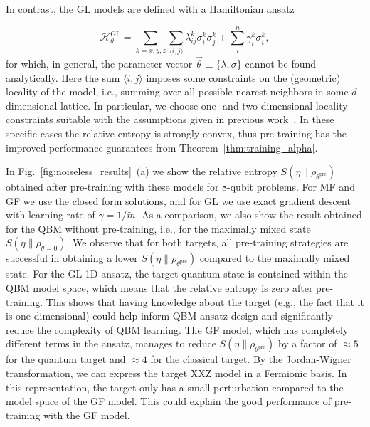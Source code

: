 \documentclass[
    reprint,
    aps,
    prx,
    longbibliography
]{revtex4-2}
\begin{document}
In contrast, the GL models are defined with a Hamiltonian ansatz

\begin{equation} 
\label{eq:glHam}
    \mathcal{H}_\theta^{\mathrm{GL}} = \sum_{k=x,y,z}\sum_{\langle i, j\rangle}\lambda^k_{ij}\sigma_i^k\sigma^k_j + \sum_i^n \gamma^k_i\sigma^k_i,
\end{equation} 
for which, in general, the parameter vector $\vec{\theta}\equiv\{\lambda, \sigma\}$ cannot be found analytically. Here the sum $\langle i, j\rangle$ imposes some constraints on the (geometric) locality of the model, i.e., summing over all possible nearest neighbors in some $d$-dimensional lattice. In particular, we choose one- and two-dimensional locality constraints suitable with the assumptions given in previous work~\cite{Anshu_2021, Haah_2024}. In these specific cases the relative entropy is strongly convex, thus pre-training has the improved performance guarantees from Theorem~\ref{thm:training_alpha}.

In Fig.~\ref{fig:noiseless_results}~(a) we show the  relative entropy $S(\eta\|\rho_{\theta^{\mathrm{pre}}})$ obtained after pre-training with these models for $8$-qubit problems. For MF and GF we use the closed form solutions, and for GL we use exact gradient descent with learning rate of $\gamma=1/\tilde{m}$. As a comparison, we also show the result obtained for the QBM without pre-training, i.e., for the maximally mixed state $S(\eta\|\rho_{\theta=0})$.
We observe that for both targets, all pre-training strategies are successful in obtaining a lower $S(\eta\|\rho_{\theta^{\mathrm{pre}}})$ compared to the maximally mixed state. For the GL 1D ansatz, the target quantum state is contained within the QBM model space, which means that the relative entropy is zero after pre-training. This shows that having knowledge about the target (e.g., the fact that it is one dimensional) could help inform QBM ansatz design and significantly reduce the complexity of QBM learning. The GF model, which has completely different terms in the ansatz, manages to reduce $S(\eta\|\rho_{\theta^{\mathrm{pre}}})$ by a factor of $\approx 5$ for the quantum target and $\approx 4$ for the classical target. By the Jordan-Wigner transformation, we can express the target XXZ model in a Fermionic basis. In this representation, the target only has a small perturbation compared to the model space of the GF model. This could explain the good performance of pre-training with the GF model. 
\end{document}
